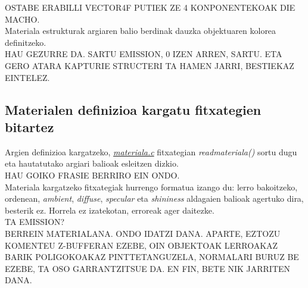 \documentclass[12pt]{article}
\newcommand{\fitxategi}[1] {\underline{\textit{#1}}}
\newcommand{\metodo}[1] {\textit{#1}}
\newcommand{\aldagai}[1] {\textit{#1}}
\begin{document}
OSTABE ERABILLI VECTOR4F PUTIEK ZE 4 KONPONENTEKOAK DIE MACHO.\\

Materiala estrukturak argiaren balio berdinak dauzka objektuaren kolorea definitzeko.\\

HAU GEZURRE DA. SARTU EMISSION, 0 IZEN ARREN, SARTU. ETA GERO ATARA KAPTURIE STRUCTERI TA HAMEN JARRI, BESTIEKAZ EINTELEZ.\\

\subsection{Materialen definizioa kargatu fitxategien bitartez}

Argien definizioa kargatzeko, \fitxategi{materiala.c} fitxategian \metodo{readmateriala()} sortu dugu eta hautatutako argiari balioak esleitzen dizkio.\\

HAU GOIKO FRASIE BERRIRO EIN ONDO.\\

Materiala kargatzeko fitxategiak hurrengo formatua izango du: lerro bakoitzeko, ordenean, \aldagai{ambient}, \aldagai{diffuse}, \aldagai{specular} eta \aldagai{shininess} aldagaien balioak agertuko dira, besterik ez. Horrela ez izatekotan, erroreak ager daitezke.\\

TA EMISSION?\\










BERREIN MATERIALANA. ONDO IDATZI DANA. APARTE, EZTOZU KOMENTEU Z-BUFFERAN EZEBE, OIN OBJEKTOAK LERROAKAZ BARIK POLIGOKOAKAZ PINTTETANGUZELA, NORMALARI BURUZ BE EZEBE, TA OSO GARRANTZITSUE DA.
EN FIN, BETE NIK JARRITEN DANA.
\end{document}
